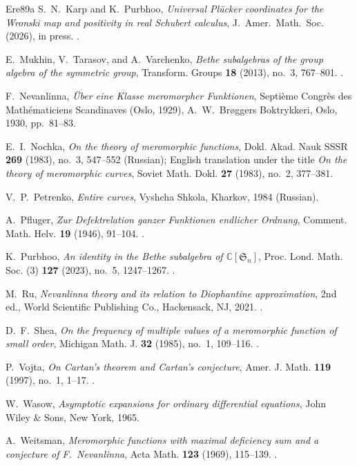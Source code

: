 \documentclass[12pt,letterpaper,reqno]{amsart}
\theoremstyle{definition}
\numberwithin{equation}{section}
\newcommand{\C}{\mathbb C}
\begin{document}
\begin{thebibliography}{Ere89a}
S.~N.~Karp and K.~Purbhoo,
\emph{Universal Pl\"ucker coordinates for the Wronski map and positivity
in real Schubert calculus},
J.~Amer.~Math.~Soc. (2026), in press.
.

E.~Mukhin, V.~Tarasov, and A.~Varchenko,
\emph{Bethe subalgebras of the group algebra of the symmetric group},
Transform. Groups \textbf{18} (2013), no.~3, 767--801.
.

F.~Nevanlinna,
\emph{\"Uber eine Klasse meromorpher Funktionen},
Septi\`eme Congr\`es des Math\'ematiciens Scandinaves
(Oslo, 1929), A.~W.~Br\o ggers Boktrykkeri, Oslo, 1930, pp.~81--83.

E.~I.~Nochka,
\emph{On the theory of meromorphic functions},
Dokl. Akad. Nauk SSSR \textbf{269} (1983), no.~3, 547--552 (Russian);
English translation under the title \emph{On the theory of meromorphic curves},
Soviet Math. Dokl. \textbf{27} (1983), no.~2, 377--381.

V.~P.~Petrenko,
\emph{Entire curves},
Vyshcha Shkola, Kharkov, 1984 (Russian).

A.~Pfluger,
\emph{Zur Defektrelation ganzer Funktionen endlicher Ordnung},
Comment. Math. Helv. \textbf{19} (1946), 91--104.
.

K.~Purbhoo,
\emph{An identity in the Bethe subalgebra of $\C[\mathfrak S_n]$},
Proc. Lond. Math. Soc. (3) \textbf{127} (2023), no.~5, 1247--1267.
.

M.~Ru,
\emph{Nevanlinna theory and its relation to Diophantine approximation},
2nd ed., World Scientific Publishing Co., Hackensack, NJ, 2021.
.

D.~F.~Shea,
\emph{On the frequency of multiple values of a meromorphic function of
small order},
Michigan Math. J. \textbf{32} (1985), no.~1, 109--116.
.

P.~Vojta,
\emph{On Cartan's theorem and Cartan's conjecture},
Amer. J. Math. \textbf{119} (1997), no.~1, 1--17.
.

W.~Wasow,
\emph{Asymptotic expansions for ordinary differential equations},
John Wiley \& Sons, New York, 1965.

A.~Weitsman,
\emph{Meromorphic functions with maximal deficiency sum and a conjecture
of F.~Nevanlinna},
Acta Math. \textbf{123} (1969), 115--139.
.

\end{thebibliography}
\appendix
\end{document}
